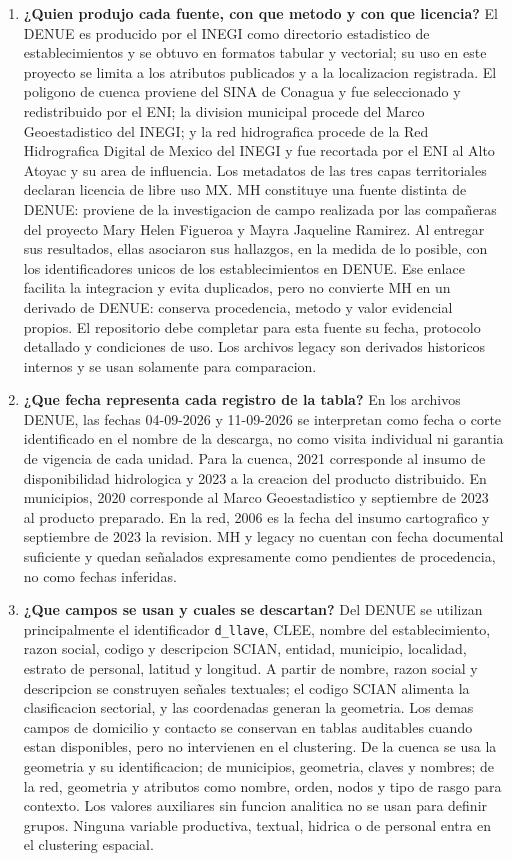 \documentclass[11pt,letterpaper]{article}
\begin{document}
\begin{enumerate}
    \item \textbf{¿Quien produjo cada fuente, con que metodo y con que licencia?}
    El DENUE es producido por el INEGI como directorio estadistico de establecimientos y se obtuvo en formatos tabular y vectorial; su uso en este proyecto se limita a los atributos publicados y a la localizacion registrada. El poligono de cuenca proviene del SINA de Conagua y fue seleccionado y redistribuido por el ENI; la division municipal procede del Marco Geoestadistico del INEGI; y la red hidrografica procede de la Red Hidrografica Digital de Mexico del INEGI y fue recortada por el ENI al Alto Atoyac y su area de influencia. Los metadatos de las tres capas territoriales declaran licencia de libre uso MX. MH constituye una fuente distinta de DENUE: proviene de la investigacion de campo realizada por las compañeras del proyecto Mary Helen Figueroa y Mayra Jaqueline Ramirez. Al entregar sus resultados, ellas asociaron sus hallazgos, en la medida de lo posible, con los identificadores unicos de los establecimientos en DENUE. Ese enlace facilita la integracion y evita duplicados, pero no convierte MH en un derivado de DENUE: conserva procedencia, metodo y valor evidencial propios. El repositorio debe completar para esta fuente su fecha, protocolo detallado y condiciones de uso. Los archivos legacy son derivados historicos internos y se usan solamente para comparacion.

    \item \textbf{¿Que fecha representa cada registro de la tabla?}
    En los archivos DENUE, las fechas 04-09-2026 y 11-09-2026 se interpretan como fecha o corte identificado en el nombre de la descarga, no como visita individual ni garantia de vigencia de cada unidad. Para la cuenca, 2021 corresponde al insumo de disponibilidad hidrologica y 2023 a la creacion del producto distribuido. En municipios, 2020 corresponde al Marco Geoestadistico y septiembre de 2023 al producto preparado. En la red, 2006 es la fecha del insumo cartografico y septiembre de 2023 la revision. MH y legacy no cuentan con fecha documental suficiente y quedan señalados expresamente como pendientes de procedencia, no como fechas inferidas.

    \item \textbf{¿Que campos se usan y cuales se descartan?}
    Del DENUE se utilizan principalmente el identificador \texttt{d\_llave}, CLEE, nombre del establecimiento, razon social, codigo y descripcion SCIAN, entidad, municipio, localidad, estrato de personal, latitud y longitud. A partir de nombre, razon social y descripcion se construyen señales textuales; el codigo SCIAN alimenta la clasificacion sectorial, y las coordenadas generan la geometria. Los demas campos de domicilio y contacto se conservan en tablas auditables cuando estan disponibles, pero no intervienen en el clustering. De la cuenca se usa la geometria y su identificacion; de municipios, geometria, claves y nombres; de la red, geometria y atributos como nombre, orden, nodos y tipo de rasgo para contexto. Los valores auxiliares sin funcion analitica no se usan para definir grupos. Ninguna variable productiva, textual, hidrica o de personal entra en el clustering espacial.


\end{enumerate}
\end{document}
